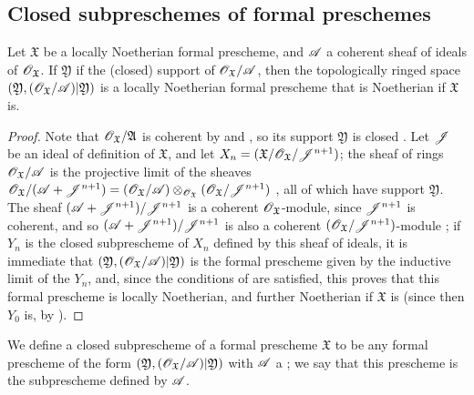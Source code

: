 \subsection{Closed subpreschemes of formal preschemes}
\label{subsection:I.10.14}

\begin{proposition}[10.14.1]
\label{I.10.14.1}
Let $\mathfrak{X}$ be a locally Noetherian formal prescheme, and $\mathscr{A}$ a coherent sheaf of ideals of $\mathscr{O}_\mathfrak{X}$.
If $\mathfrak{Y}$ if the (closed) support of $\mathscr{O}_\mathfrak{X}/\mathscr{A}$, then the topologically ringed space $(\mathfrak{Y},(\mathscr{O}_\mathfrak{X}/\mathscr{A})|\mathfrak{Y})$ is a locally Noetherian formal prescheme that is Noetherian if $\mathfrak{X}$ is.
\end{proposition}

\begin{proof}
Note that $\mathscr{O}_\mathfrak{X}/\mathfrak{A}$ is coherent by  and , so its support $\mathfrak{Y}$ is closed .
Let $\mathscr{J}$ be an ideal of definition of $\mathfrak{X}$, and let $X_n=(\mathfrak{X}/\mathscr{O}_\mathfrak{X}/\mathscr{J}^{n+1})$;
the sheaf of rings $\mathscr{O}_\mathfrak{X}/\mathscr{A}$ is the projective limit of the sheaves $\mathscr{O}_\mathfrak{X}/(\mathscr{A}+\mathscr{J}^{n+1})=(\mathscr{O}_\mathfrak{X}/\mathscr{A})\otimes_{\mathscr{O}_\mathfrak{X}}(\mathscr{O}_\mathfrak{X}/\mathscr{J}^{n+1})$ , all of which have support $\mathfrak{Y}$.
The sheaf $(\mathscr{A}+\mathscr{J}^{n+1})/\mathscr{J}^{n+1}$ is a coherent $\mathscr{O}_\mathfrak{X}$-module, since $\mathscr{J}^{n+1}$ is coherent, and so $(\mathscr{A}+\mathscr{J}^{n+1})/\mathscr{J}^{n+1}$ is also a coherent $(\mathscr{O}_\mathfrak{X}/\mathscr{J}^{n+1})$-module ;
if $Y_n$ is the closed subprescheme of $X_n$ defined by this sheaf of ideals, it is immediate that $(\mathfrak{Y},(\mathscr{O}_\mathfrak{X}/\mathscr{A})|\mathfrak{Y})$
is the formal prescheme given by the inductive limit of the $Y_n$, and, since the conditions of  are satisfied, this proves that this formal prescheme is locally Noetherian, and further Noetherian if $\mathfrak{X}$ is (since then $Y_0$ is, by ).
\end{proof}

\begin{definition}[10.14.2]
\label{I.10.14.2}
We define a closed subprescheme of a formal prescheme $\mathfrak{X}$ to be any formal prescheme of the form $(\mathfrak{Y},(\mathscr{O}_\mathfrak{X}/\mathscr{A})|\mathfrak{Y})$ with $\mathscr{A}$ a ;
we say that this prescheme is the subprescheme defined by $\mathscr{A}$.
\end{definition}

